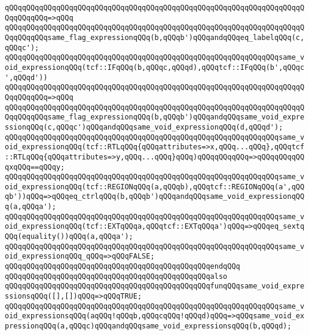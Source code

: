 \verb|qQQqqQQqqQQqqQQqqQQqqQQqqQQqqQQqqQQqqQQqqQQqqQQqqQQqqQQqqQQqqQQqqQQqqQQqqQQqqQQq=>qQQq|\newline
\verb|qQQqqQQqqQQqqQQqqQQqqQQqqQQqqQQqqQQqqQQqqQQqqQQqqQQqqQQqqQQqqQQqqQQqqQQqqQQqqQQqsame_flag_expressionqQQq(b,qQQqb')qQQqandqQQqeq_labelqQQq(c,qQQqc');|\newline
\newline
\verb|qQQqqQQqqQQqqQQqqQQqqQQqqQQqqQQqqQQqqQQqqQQqqQQqqQQqqQQqqQQqqQQqsame_void_expressionqQQq(tcf::IFqQQq(b,qQQqc,qQQqd),qQQqtcf::IFqQQq(b',qQQqc',qQQqd'))|\newline
\verb|qQQqqQQqqQQqqQQqqQQqqQQqqQQqqQQqqQQqqQQqqQQqqQQqqQQqqQQqqQQqqQQqqQQqqQQqqQQqqQQq=>qQQq|\newline
\verb|qQQqqQQqqQQqqQQqqQQqqQQqqQQqqQQqqQQqqQQqqQQqqQQqqQQqqQQqqQQqqQQqqQQqqQQqqQQqqQQqsame_flag_expressionqQQq(b,qQQqb')qQQqandqQQqsame_void_expressionqQQq(c,qQQqc')qQQqandqQQqsame_void_expressionqQQq(d,qQQqd');|\newline
\newline
\verb|qQQqqQQqqQQqqQQqqQQqqQQqqQQqqQQqqQQqqQQqqQQqqQQqqQQqqQQqqQQqqQQqsame_void_expressionqQQq(tcf::RTLqQQq{qQQqattributes=>x,qQQq...qQQq},qQQqtcf::RTLqQQq{qQQqattributes=>y,qQQq...qQQq}qQQq)qQQqqQQqqQQq=>qQQqqQQqqQQqxqQQq==qQQqy;|\newline
\verb|qQQqqQQqqQQqqQQqqQQqqQQqqQQqqQQqqQQqqQQqqQQqqQQqqQQqqQQqqQQqqQQqsame_void_expressionqQQq(tcf::REGIONqQQq(a,qQQqb),qQQqtcf::REGIONqQQq(a',qQQqb'))qQQq=>qQQqeq_ctrlqQQq(b,qQQqb')qQQqandqQQqsame_void_expressionqQQq(a,qQQqa');|\newline
\verb|qQQqqQQqqQQqqQQqqQQqqQQqqQQqqQQqqQQqqQQqqQQqqQQqqQQqqQQqqQQqqQQqsame_void_expressionqQQq(tcf::EXTqQQqa,qQQqtcf::EXTqQQqa')qQQq=>qQQqeq_sextqQQq(equality())qQQq(a,qQQqa');|\newline
\verb|qQQqqQQqqQQqqQQqqQQqqQQqqQQqqQQqqQQqqQQqqQQqqQQqqQQqqQQqqQQqqQQqsame_void_expressionqQQq_qQQq=>qQQqFALSE;|\newline
\verb|qQQqqQQqqQQqqQQqqQQqqQQqqQQqqQQqqQQqqQQqqQQqqQQqendqQQq|\newline
\newline
\verb|qQQqqQQqqQQqqQQqqQQqqQQqqQQqqQQqqQQqqQQqqQQqqQQqalso|\newline
\verb|qQQqqQQqqQQqqQQqqQQqqQQqqQQqqQQqqQQqqQQqqQQqqQQqfunqQQqsame_void_expressionsqQQq([],[])qQQq=>qQQqTRUE;|\newline
\verb|qQQqqQQqqQQqqQQqqQQqqQQqqQQqqQQqqQQqqQQqqQQqqQQqqQQqqQQqqQQqqQQqsame_void_expressionsqQQq(aqQQq!qQQqb,qQQqcqQQq!qQQqd)qQQq=>qQQqsame_void_expressionqQQq(a,qQQqc)qQQqandqQQqsame_void_expressionsqQQq(b,qQQqd);|\newline
